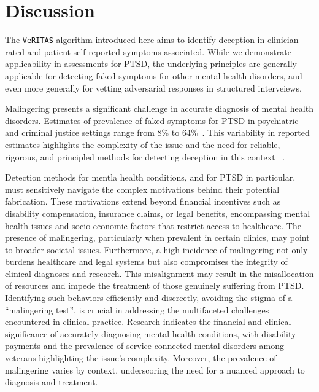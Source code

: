 \documentclass[onecolumn,10pt]{IEEEtran}
\def\vrts{\texttt{VeRITAS}\xspace}
\begin{document}
\section*{Discussion}
The  \vrts algorithm introduced here aims to identify deception in clinician rated and patient self-reported symptoms associated. While we demonstrate applicability in assessments for PTSD, the underlying principles are generally applicable for detecting faked symptoms for other mental health disorders, and even more  generally for vetting adversarial responses in structured interveiews.

Malingering presents a significant challenge in accurate diagnosis of mental health disorders. Estimates of prevalence of faked symptoms for PTSD in psychiatric and criminal justice settings range from 8\% to 64\%~\cite{mcdermott2013malingering,schmidt2020base,matto2019systematic}.  This variability in reported estimates highlights the complexity of the issue and the need for reliable, rigorous, and principled methods for detecting deception in this context ~\cite{DePaulo2003}.

Detection methods for mentla health conditions, and for PTSD in particular,  must sensitively navigate the complex motivations behind their potential fabrication. These motivations extend beyond financial incentives such as disability compensation, insurance claims, or legal benefits, encompassing mental health issues and socio-economic factors that restrict access to healthcare. The presence of malingering, particularly when prevalent in certain clinics, may point to broader societal issues. Furthermore, a high incidence of malingering not only burdens healthcare and legal systems but also compromises the integrity of clinical diagnoses and research. This misalignment may result in the misallocation of resources and impede the treatment of those genuinely suffering from PTSD. Identifying such behaviors efficiently and discreetly, avoiding the stigma of a ``malingering test'', is crucial in addressing the multifaceted challenges encountered in clinical practice. Research indicates the financial and clinical significance of accurately diagnosing mental health conditions, with disability payments and the prevalence of service-connected mental disorders among veterans highlighting the issue's complexity. Moreover, the prevalence of malingering varies by context, underscoring the need for a nuanced approach to diagnosis and treatment.
\end{document}
